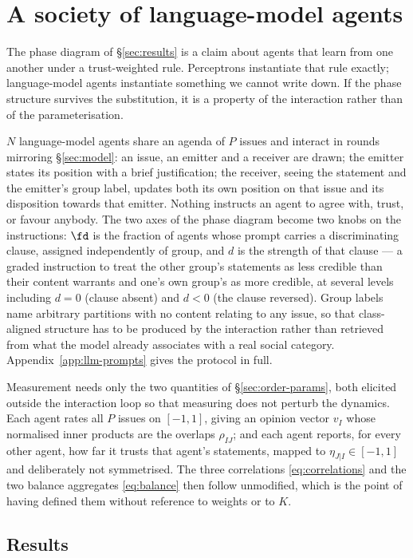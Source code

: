 \section{A society of language-model agents}
\label{sec:llm}

The phase diagram of \S\ref{sec:results} is a claim about agents that learn from
one another under a trust-weighted rule. Perceptrons instantiate that rule
exactly; language-model agents instantiate something we cannot write down. If the
phase structure survives the substitution, it is a property of the interaction
rather than of the parameterisation.

$N$ language-model agents share an agenda of $P$ issues and interact in rounds
mirroring \S\ref{sec:model}: an issue, an emitter and a receiver are drawn; the
emitter states its position with a brief justification; the receiver, seeing the
statement and the emitter's group label, updates both its own position on that
issue and its disposition towards that emitter. Nothing instructs an agent to
agree with, trust, or favour anybody. The two axes of the phase diagram become two
knobs on the instructions: $\fd$ is the fraction of agents whose prompt carries a
discriminating clause, assigned independently of group, and $d$ is the strength of
that clause --- a graded instruction to treat the other group's statements as less
credible than their content warrants and one's own group's as more credible, at
several levels including $d=0$ (clause absent) and $d<0$ (the clause reversed).
Group labels name arbitrary partitions with no content relating to any issue, so
that class-aligned structure has to be produced by the interaction rather than
retrieved from what the model already associates with a real social category.
Appendix~\ref{app:llm-prompts} gives the protocol in full.

Measurement needs only the two quantities of \S\ref{sec:order-params}, both
elicited outside the interaction loop so that measuring does not perturb the
dynamics. Each agent rates all $P$ issues on $[-1,1]$, giving an opinion vector
$v_I$ whose normalised inner products are the overlaps $\rho_{IJ}$; and each agent
reports, for every other agent, how far it trusts that agent's statements, mapped
to $\eta_{J|I}\in[-1,1]$ and deliberately not symmetrised. The three correlations
\eqref{eq:correlations} and the two balance aggregates \eqref{eq:balance} then
follow unmodified, which is the point of having defined them without reference to
weights or to $K$.

\subsection{Results}
\label{sec:llm-results}


